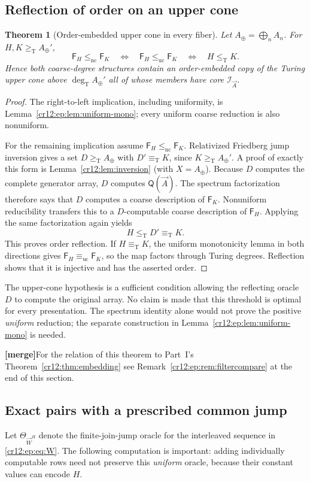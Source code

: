 \documentclass[11pt,letterpaper]{article}
\theoremstyle{plain}
\newtheorem{theorem}{Theorem}[section]
\theoremstyle{definition}
\theoremstyle{remark}
\numberwithin{equation}{section}
\newcommand{\leT}{\leq_{\mathrm T}}
\newcommand{\geT}{\geq_{\mathrm T}}
\newcommand{\eqT}{\equiv_{\mathrm T}}
\newcommand{\leuc}{\leq_{\mathrm{uc}}}
\newcommand{\lenc}{\leq_{\mathrm{nc}}}
\newcommand{\equc}{\equiv_{\mathrm{uc}}}
\newcommand{\degT}{\deg_{\mathrm T}}
\newcommand{\I}{\mathcal I}
\newcommand{\mergenote}[1]{\par\smallskip\noindent
 {\small\textsf{\textbf{[merge]}}\enspace #1}\par\smallskip}
\newcommand{\Aplus}{A_{\oplus}}          %
\newcommand{\QQ}{\mathsf Q}              %
\newcommand{\Fint}{\mathsf F}            %
\newcommand{\WW}{\vec W}                 %
\begin{document}
\subsection{Reflection of order on an upper cone}
\begin{theorem}[Order-embedded upper cone in every fiber]\label{cr12:ep:thm:embedding}
Let $\Aplus=\bigoplus_n A_n$. For $H,K\geT \Aplus'$,
\[
 \Fint_H\lenc \Fint_K\quad\Longleftrightarrow\quad
 \Fint_H\leuc \Fint_K\quad\Longleftrightarrow\quad H\leT K.
\]
Hence both coarse-degree structures contain an order-embedded copy of the Turing
upper cone above $\degT \Aplus'$ all of whose members have core $\I_{\vec A}$.
\end{theorem}
\begin{proof}
The right-to-left implication, including uniformity, is
Lemma~\ref{cr12:ep:lem:uniform-mono}; every uniform coarse reduction is also
nonuniform.

For the remaining implication assume $\Fint_H\lenc \Fint_K$. Relativized Friedberg
jump inversion gives a set $D\geT \Aplus$ with $D'\eqT K$, since $K\geT \Aplus'$. A
proof of exactly this form is Lemma~\ref{cr12:lem:inversion} (with $X=\Aplus$).
Because $D$ computes the complete generator array, $D$ computes $\QQ(\vec A)$. The
spectrum factorization therefore says that $D$ computes a coarse description of
$\Fint_K$. Nonuniform reducibility transfers this to a $D$-computable coarse
description of $\Fint_H$. Applying the same factorization again yields
\[
 H\leT D'\eqT K.
\]
This proves order reflection. If $H\eqT K$, the uniform monotonicity lemma in both
directions gives $\Fint_H\equc \Fint_K$, so the map factors through Turing degrees.
Reflection shows that it is injective and has the asserted order.
\end{proof}

The upper-cone hypothesis is a sufficient condition allowing the reflecting oracle
$D$ to compute the original array. No claim is made that this threshold is optimal
for every presentation. The spectrum identity alone would not prove the positive
\emph{uniform} reduction; the separate construction in
Lemma~\ref{cr12:ep:lem:uniform-mono} is needed.

\mergenote{For the relation of this theorem to Part~I's
Theorem~\ref{cr12:thm:embedding} see Remark~\ref{cr12:ep:rem:filtercompare} at the end
of this section.}

\subsection{Exact pairs with a prescribed common jump}
Let $\Theta_{\WW^H}$ denote the finite-join-jump oracle for the interleaved sequence
in \eqref{cr12:ep:eq:W}. The following computation is important: adding individually
computable rows need not preserve this \emph{uniform} oracle, because their constant
values can encode $H$.
\end{document}
